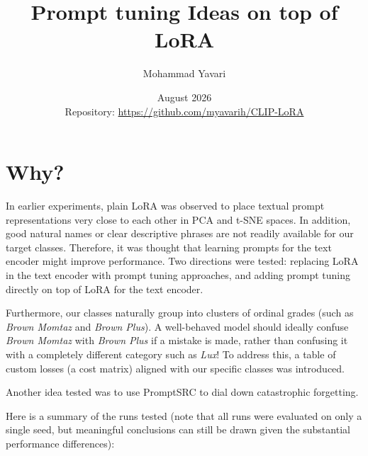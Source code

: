\documentclass[letterpaper,11pt,leqno]{article}
\begin{document}
\title{Prompt tuning Ideas on top of LoRA}
\author{Mohammad Yavari}
\date{August 2026 \\[0.5em] \small Repository: \url{https://github.com/myavarih/CLIP-LoRA}}

\begin{titlepage}
\maketitle
\end{titlepage}

\tableofcontents
\newpage

\section{Why?}

In earlier experiments, plain LoRA was observed to place textual prompt representations very close to each other in PCA and t-SNE spaces. In addition, good natural names or clear descriptive phrases are not readily available for our target classes. Therefore, it was thought that learning prompts for the text encoder might improve performance. Two directions were tested: replacing LoRA in the text encoder with prompt tuning approaches, and adding prompt tuning directly on top of LoRA for the text encoder.

Furthermore, our classes naturally group into clusters of ordinal grades (such as \textit{Brown Momtaz} and \textit{Brown Plus}). A well-behaved model should ideally confuse \textit{Brown Momtaz} with \textit{Brown Plus} if a mistake is made, rather than confusing it with a completely different category such as \textit{Lux}! To address this, a table of custom losses (a cost matrix) aligned with our specific classes was introduced.

Another idea tested was to use PromptSRC to dial down catastrophic forgetting.

Here is a summary of the runs tested (note that all runs were evaluated on only a single seed, but meaningful conclusions can still be drawn given the substantial performance differences):
\end{document}
